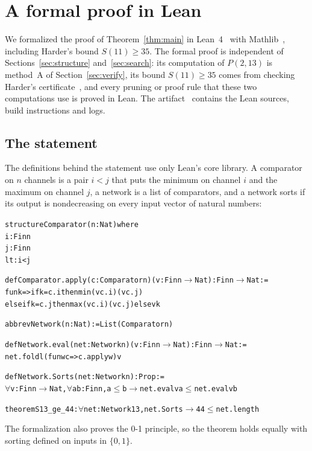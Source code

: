 
\section{A formal proof in Lean}\label{sec:lean}

We formalized the proof of Theorem~\ref{thm:main} in Lean~4~\cite{Lean4} with Mathlib~\cite{Mathlib},
including Harder's bound $S(11)\ge35$. The formal proof is independent of Sections~\ref{sec:structure}
and~\ref{sec:search}: its computation of $P(2,13)$ is method~A of Section~\ref{sec:verify}, its bound
$S(11)\ge35$ comes from checking Harder's certificate~\cite{Har19}, and every pruning or proof rule
that these two computations use is proved in Lean. The artifact~\cite{LeanRepo} contains the Lean
sources, build instructions and logs.

\subsection{The statement}
The definitions behind the statement use only Lean's core library. A comparator on $n$ channels is a pair
$i<j$ that puts the minimum on channel $i$ and the maximum on channel $j$, a network is a list of comparators,
and a network sorts if its output is nondecreasing on every input vector of natural numbers:
\begin{alltt}\small
structure Comparator (n : Nat) where
  i : Fin n
  j : Fin n
  lt : i < j

def Comparator.apply (c : Comparator n) (v : Fin n \(\to\) Nat) : Fin n \(\to\) Nat :=
  fun k => if k = c.i then min (v c.i) (v c.j)
    else if k = c.j then max (v c.i) (v c.j) else v k

abbrev Network (n : Nat) := List (Comparator n)

def Network.eval (net : Network n) (v : Fin n \(\to\) Nat) : Fin n \(\to\) Nat :=
  net.foldl (fun w c => c.apply w) v

def Network.Sorts (net : Network n) : Prop :=
  \(\forall\) v : Fin n \(\to\) Nat, \(\forall\) a b : Fin n, a \(\le\) b \(\to\) net.eval v a \(\le\) net.eval v b

theorem S13_ge_44 : \(\forall\) net : Network 13, net.Sorts \(\to\) 44 \(\le\) net.length
\end{alltt}
The formalization also proves the 0-1 principle, so the theorem holds equally with sorting defined on inputs in
$\{0,1\}$.

